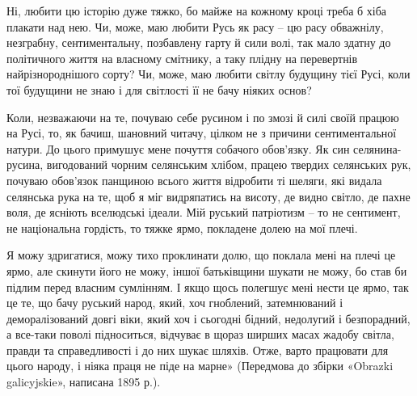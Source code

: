 Ні, любити цю історію дуже тяжко, бо майже на кожному кроці треба б хіба
плакати над нею. Чи, може, маю любити Русь як расу – цю расу обважнілу,
незграбну, сентиментальну, позбавлену гарту й сили волі, так мало здатну до
політичного життя на власному смітнику, а таку плідну на перевертнів
найрізнороднішого сорту? Чи, може, маю любити світлу будущину тієї Русі, коли
тої будущини не знаю і для світлості її не бачу ніяких основ?

Коли, незважаючи на те, почуваю себе русином і по змозі й силі своїй працюю на
Русі, то, як бачиш, шановний читачу, цілком не з причини сентиментальної
натури. До цього примушує мене почуття собачого обов’язку. Як син
селянина-русина, вигодований чорним селянським хлібом, працею твердих
селянських рук, почуваю обов’язок панщиною всього життя відробити ті шеляги,
які видала селянська рука на те, щоб я міг видряпатись на висоту, де видно
світло, де пахне воля, де ясніють вселюдські ідеали. Мій руський патріотизм –
то не сентимент, не національна гордість, то тяжке ярмо, покладене долею на мої
плечі.

Я можу здригатися, можу тихо проклинати долю, що поклала мені на плечі це ярмо,
але скинути його не можу, іншої батьківщини шукати не можу, бо став би підлим
перед власним сумлінням. І якщо щось полегшує мені нести це ярмо, так це те, що
бачу руський народ, який, хоч гноблений, затемнюваний і деморалізований довгі
віки, який хоч і сьогодні бідний, недолугий і безпорадний, а все-таки поволі
підноситься, відчуває в щораз ширших масах жадобу світла, правди та
справедливості і до них шукає шляхів. Отже, варто працювати для цього народу, і
ніяка праця не піде на марне» (Передмова до збірки «Obrazki galicyjskie»,
написана 1895 р.).

